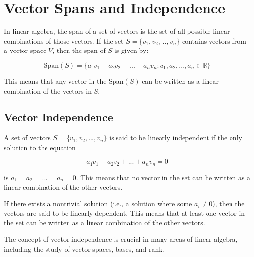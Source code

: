 \chapter{Vector Spans and Independence}


In linear algebra, the span of a set of vectors is the set of all possible linear combinations of those vectors. If the set $S = \{v_1, v_2, ..., v_n\}$ contains vectors from a vector space $V$, then the span of $S$ is given by:

\begin{equation}
\text{Span}(S) = \{a_1v_1 + a_2v_2 + ... + a_nv_n : a_1, a_2, ..., a_n \in \mathbb{R}\}
\end{equation}

This means that any vector in the Span$(S)$ can be written as a linear combination of the vectors in $S$.

\section{Vector Independence}

A set of vectors $S = \{v_1, v_2, ..., v_n\}$ is said to be linearly independent if the only solution to the equation 

\begin{equation}
a_1v_1 + a_2v_2 + ... + a_nv_n = 0
\end{equation}

is $a_1 = a_2 = ... = a_n = 0$. This means that no vector in the set can be written as a linear combination of the other vectors.

If there exists a nontrivial solution (i.e., a solution where some $a_i \neq 0$), then the vectors are said to be linearly dependent. This means that at least one vector in the set can be written as a linear combination of the other vectors.

The concept of vector independence is crucial in many areas of linear algebra, including the study of vector spaces, bases, and rank.

